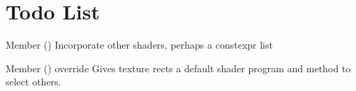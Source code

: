 \chapter{Todo List}
\hypertarget{todo}{}\label{todo}

\begin{DoxyRefList}
\item[Member \doxylink{classApp_a26c8801e7a5375be8b96453ae0a7f451}{App\+::Create\+Graphics\+Pipeline} ()]\label{todo__todo000001}%
%
Incorporate other shaders, perhaps a constexpr list  
\item[Member \doxylink{classTexturedRect2D_aa37daeff9f2db40e9effbb737349e99e}{Textured\+Rect2D\+::Render} () override]\label{todo__todo000002}%
%
Gives texture rects a default shader program and method to select others. 
\end{DoxyRefList}
